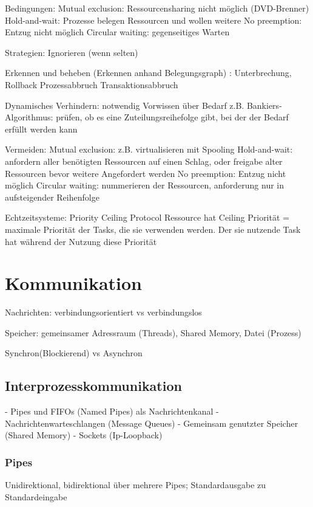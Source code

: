 Bedingungen: 
Mutual exclusion: Ressourcensharing nicht möglich (DVD-Brenner)
Hold-and-wait: Prozesse belegen Ressourcen und wollen weitere
No preemption: Entzug nicht möglich
Circular waiting: gegenseitiges Warten

Strategien: 
Ignorieren (wenn selten)

Erkennen und beheben (Erkennen anhand Belegungsgraph) :
Unterbrechung, Rollback Prozessabbruch Transaktionsabbruch

Dynamisches Verhindern: notwendig Vorwissen über Bedarf
z.B. Bankiers-Algorithmus: prüfen, ob es eine Zuteilungsreihefolge gibt, bei der der Bedarf erfüllt werden kann

Vermeiden:
Mutual exclusion: z.B. virtualisieren mit Spooling
Hold-and-wait: anfordern aller benötigten Ressourcen auf einen Schlag, oder freigabe alter Ressourcen bevor weitere Angefordert werden
No preemption: Entzug nicht möglich
Circular waiting: nummerieren der Ressourcen, anforderung nur in aufsteigender Reihenfolge

Echtzeitsysteme: Priority Ceiling Protocol
Ressource hat Ceiling Priorität = maximale Priorität der Tasks, die sie verwenden werden. Der sie nutzende Task hat während der Nutzung diese Priorität

\section*{Kommunikation}
Nachrichten: verbindungsorientiert vs verbindungslos

Speicher: gemeinsamer Adressraum (Threads), Shared Memory, Datei (Prozess)

Synchron(Blockierend) vs Asynchron

\subsection*{Interprozesskommunikation}
- Pipes und FIFOs (Named Pipes) als Nachrichtenkanal
- Nachrichtenwarteschlangen (Message Queues)
- Gemeinsam genutzter Speicher (Shared Memory)
- Sockets (Ip-Loopback)
\subsubsection*{Pipes}
Unidirektional, bidirektional über mehrere Pipes; Standardausgabe zu Standardeingabe

